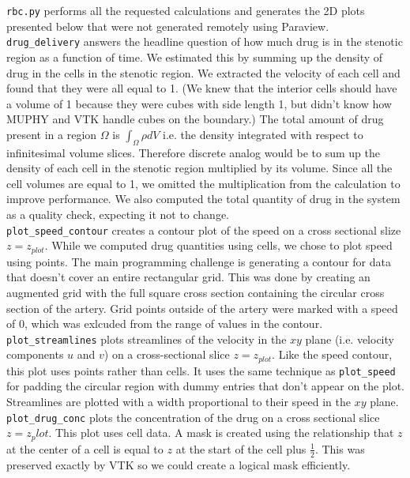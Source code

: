 \documentclass[11pt]{article} %
\newcommand{\tty}[1]{\texttt{#1}}
\begin{document}
\tty{rbc.py} performs all the requested calculations and generates the 2D plots presented 
below that were not generated remotely using Paraview. \\
\tty{drug\_delivery} answers the headline question of how much drug is in the stenotic
region as a function of time.  
We estimated this by summing up the density of drug in the cells in the stenotic region.
We extracted the velocity of each cell and found that they were all equal to 1.
(We knew that the interior cells should have a volume of 1 because they were cubes
with side length 1, but didn't know how MUPHY and VTK handle cubes on the boundary.)
The total amount of drug present in a region $\Omega$ is $\int_{\Omega} \rho dV$
i.e. the density integrated with respect to infinitesimal volume slices.
Therefore discrete analog would be to sum up the density of each cell in the stenotic region multiplied by its volume.  
Since all the cell volumes are equal to 1, we omitted the multiplication from the calculation to improve performance.
We also computed the total quantity of drug in the system as a quality check, expecting it not to change.\\
\tty{plot\_speed\_contour} creates a contour plot of the speed on a cross sectional slize $z=z_{plot}$.
While we computed drug quantities using cells, we chose to plot speed using points.
The main programming challenge is generating a contour for data that doesn't cover an entire rectangular grid.
This was done by creating an augmented grid with the full square cross section containing
the circular cross section of the artery.
Grid points outside of the artery were marked with a speed of 0, which was exlcuded from the
range of values in the contour.\\
\tty{plot\_streamlines} plots streamlines of the velocity in the $xy$ plane
(i.e. velocity components $u$ and $v$) on a cross-sectional slice $z=z_{plot}$.
Like the speed contour, this plot uses points rather than cells.
It uses the same technique as \tty{plot\_speed} for padding the circular region
with dummy entries that don't appear on the plot.
Streamlines are plotted with a width proportional to their speed in the $xy$ plane.\\
\tty{plot\_drug\_conc} plots the concentration of the drug on a cross sectional slice $z=z_plot$.
This plot uses cell data.  
A mask is created using the relationship that $z$ at the center of a cell is equal to 
$z$ at the start of the cell plus $\frac{1}{2}$.  
This was preserved exactly by VTK so we could create a logical mask efficiently.
\end{document}
